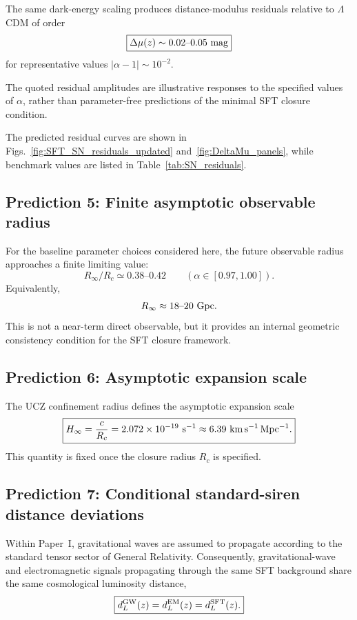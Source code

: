 \documentclass[12pt]{article}
\begin{document}
The same dark-energy scaling produces distance-modulus residuals relative to
$\Lambda$CDM of order
\[
\boxed{
\Delta\mu(z)\sim0.02\text{--}0.05~{\rm mag}
}
\]
for representative values $|\alpha-1|\sim10^{-2}$.

The quoted residual amplitudes are illustrative responses to the
specified values of $\alpha$, rather than parameter-free predictions
of the minimal SFT closure condition.

The predicted residual curves are shown in
Figs.~\ref{fig:SFT_SN_residuals_updated}
and~\ref{fig:DeltaMu_panels}, while benchmark values are listed in
Table~\ref{tab:SN_residuals}.

\subsection{Prediction 5: Finite asymptotic observable radius}

For the baseline parameter choices considered here, the future observable
radius approaches a finite limiting value:
\[
\boxed{
R_\infty/R_c\simeq0.38\text{--}0.42
\qquad
(\alpha\in[0.97,1.00]).
}
\]
Equivalently,
\[
R_\infty\approx18\text{--}20~{\rm Gpc}.
\]
This is not a near-term direct observable, but it provides an internal
geometric consistency condition for the SFT closure framework.

\subsection{Prediction 6: Asymptotic expansion scale}

The UCZ confinement radius defines the asymptotic expansion scale
\[
\boxed{
H_\infty=\frac{c}{R_c}
=
2.072\times10^{-19}~{\rm s^{-1}}
\approx6.39~{\rm km\,s^{-1}\,Mpc^{-1}}.
}
\]
This quantity is fixed once the closure radius $R_c$ is specified.

\subsection{Prediction 7: Conditional standard-siren distance deviations}

Within Paper~I, gravitational waves are assumed to propagate according
to the standard tensor sector of General Relativity. Consequently,
gravitational-wave and electromagnetic signals propagating through the
same SFT background share the same cosmological luminosity distance,
\begin{equation}
\boxed{
d_L^{\rm GW}(z)
=
d_L^{\rm EM}(z)
=
d_L^{\rm SFT}(z).
}
\end{equation}
\end{document}
